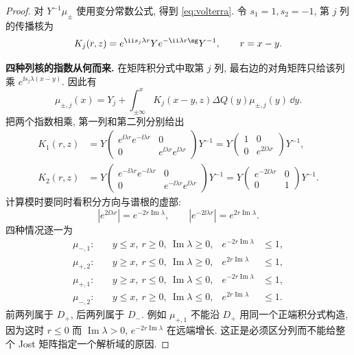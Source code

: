 \begin{proof}
对 $Y^{-1}\mu_\pm$ 使用变分常数公式, 得到 \eqref{eq:volterra}. 令 $s_1=1,s_2=-1$, 第 $j$ 列的传播核为
\begin{equation}\label{eq:columnkernel}
K_j(r,z)=e^{\ii s_j\lambda r}Y e^{-\ii\lambda r\sg}Y^{-1},\qquad r=x-y.
\end{equation}

\par\medskip\noindent\textbf{四种列核的指数从何而来.}\quad 
在矩阵积分式中取第 $j$ 列, 最右边的对角矩阵只给该列乘
$e^{\ii s_j\lambda(x-y)}$. 因此有
\[
\mu_{\pm,j}(x)
=Y_j+\int_{\pm\infty}^{x}
K_j(x-y,z)\Delta Q(y)\mu_{\pm,j}(y)\,\dd y.
\]
把两个指数相乘, 第一列和第二列分别给出
\begin{align*}
K_1(r,z)
&=Y\begin{pmatrix}e^{\ii\lambda r}e^{-\ii\lambda r}&0\\
0&e^{\ii\lambda r}e^{\ii\lambda r}\end{pmatrix}Y^{-1}
=Y\begin{pmatrix}1&0\\0&e^{2\ii\lambda r}\end{pmatrix}Y^{-1},\\
K_2(r,z)
&=Y\begin{pmatrix}e^{-\ii\lambda r}e^{-\ii\lambda r}&0\\
0&e^{-\ii\lambda r}e^{\ii\lambda r}\end{pmatrix}Y^{-1}
=Y\begin{pmatrix}e^{-2\ii\lambda r}&0\\0&1\end{pmatrix}Y^{-1}.
\end{align*}
计算模时要同时看积分方向与谱根的虚部:
\[
|e^{2\ii\lambda r}|=e^{-2r\operatorname{Im}\lambda},
\qquad
|e^{-2\ii\lambda r}|=e^{2r\operatorname{Im}\lambda}.
\]
四种情况逐一为
\begin{align*}
\mu_{-,1}:&\quad y\le x,\ r\ge0,\ \operatorname{Im}\lambda\ge0,
& e^{-2r\operatorname{Im}\lambda}&\le1,\\
\mu_{+,2}:&\quad y\ge x,\ r\le0,\ \operatorname{Im}\lambda\ge0,
& e^{2r\operatorname{Im}\lambda}&\le1,\\
\mu_{+,1}:&\quad y\ge x,\ r\le0,\ \operatorname{Im}\lambda\le0,
& e^{-2r\operatorname{Im}\lambda}&\le1,\\
\mu_{-,2}:&\quad y\le x,\ r\ge0,\ \operatorname{Im}\lambda\le0,
& e^{2r\operatorname{Im}\lambda}&\le1.
\end{align*}
前两列属于 $D_+$, 后两列属于 $D_-$.
例如 $\mu_{+,1}$ 不能沿 $D_+$ 用同一个正端积分式构造,
因为这时 $r\le0$ 而 $\operatorname{Im}\lambda>0$,
$e^{-2r\operatorname{Im}\lambda}$ 在远端增长.
这正是必须区分列而不能给整个 Jost 矩阵指定一个解析域的原因.


\end{proof}
